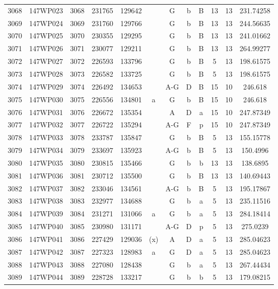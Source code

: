 \begin{tabular}{|*{12}{c|}}
3068 & 147WP023 & 3068 & 231765 & 129642 &  & G & b & B & 13 & 13 & 231.74258 \\ 
3069 & 147WP024 & 3069 & 231760 & 129766 &  & G & b & B & 13 & 13 & 244.56635 \\ 
3070 & 147WP025 & 3070 & 230355 & 129295 &  & G & b & B & 13 & 13 & 241.01662 \\ 
3071 & 147WP026 & 3071 & 230077 & 129211 &  & G & b & B & 13 & 13 & 264.99277 \\ 
3072 & 147WP027 & 3072 & 226593 & 133796 &  & G & b & B & 5 & 13 & 198.61575 \\ 
3073 & 147WP028 & 3073 & 226582 & 133725 &  & G & b & B & 5 & 13 & 198.61575 \\ 
3074 & 147WP029 & 3074 & 226492 & 134653 &  & A-G & D & B & 15 & 10 & 246.618 \\ 
3075 & 147WP030 & 3075 & 226556 & 134801 & a & G & b & B & 15 & 10 & 246.618 \\ 
3076 & 147WP031 & 3076 & 226672 & 135354 &  & A & D & a & 15 & 10 & 247.87349 \\ 
3077 & 147WP032 & 3077 & 226722 & 135294 &  & A-G & F & p & 15 & 10 & 247.87349 \\ 
3078 & 147WP033 & 3078 & 233787 & 135847 &  & G & b & B & 5 & 13 & 155.15778 \\ 
3079 & 147WP034 & 3079 & 233697 & 135923 &  & A-G & b & B & 5 & 13 & 150.4996 \\ 
3080 & 147WP035 & 3080 & 230815 & 135466 &  & G & b & b & 13 & 13 & 138.6895 \\ 
3081 & 147WP036 & 3081 & 230712 & 135500 &  & G & b & B & 13 & 13 & 140.69443 \\ 
3082 & 147WP037 & 3082 & 233046 & 134561 &  & A-G & b & B & 5 & 13 & 195.17867 \\ 
3083 & 147WP038 & 3083 & 232977 & 134688 &  & G & b & a & 5 & 13 & 235.11516 \\ 
3084 & 147WP039 & 3084 & 231271 & 131066 & a & G & b & a & 5 & 13 & 284.18414 \\ 
3085 & 147WP040 & 3085 & 230980 & 131171 &  & A-G & D & p & 5 & 13 & 275.0239 \\ 
3086 & 147WP041 & 3086 & 227429 & 129036 & (x) & A & D & a & 5 & 13 & 285.04623 \\ 
3087 & 147WP042 & 3087 & 227323 & 128983 & a & G & D & a & 5 & 13 & 285.04623 \\ 
3088 & 147WP043 & 3088 & 227080 & 128438 &  & G & b & a & 5 & 13 & 267.44434 \\ 
3089 & 147WP044 & 3089 & 228728 & 133217 &  & G & b & b & 5 & 13 & 179.08215 \\ 

\end{tabular}
